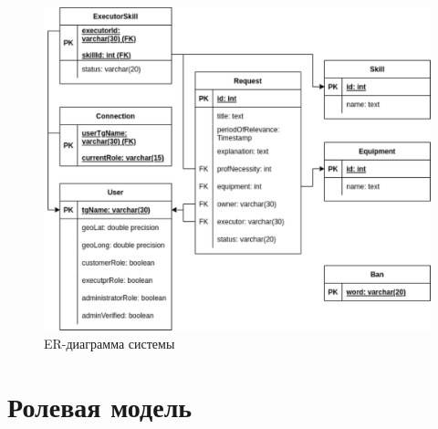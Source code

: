 \begin{figure}[H]
	\begin{center}
		\includegraphics[page=1,scale=0.8]{assets/er.pdf}
	\end{center}
	\caption{ER-диаграмма системы}
	\label{er}
\end{figure}

\section{Ролевая модель}

